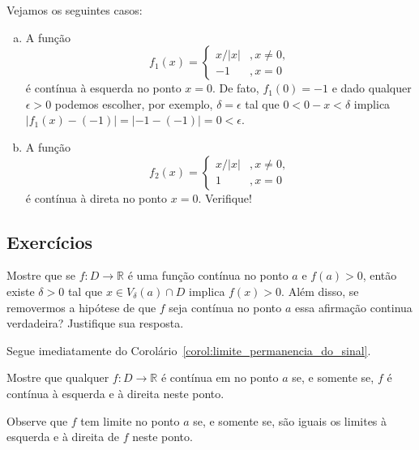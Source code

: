 \begin{ex}
  Vejamos os seguintes casos:
  \begin{enumerate}[a)]
    \item A função
      \begin{equation}
        f_1(x) = \left\{
          \begin{array}{ll}
            x/|x| &, x\neq 0,\\
            -1 &, x=0
          \end{array}
\right.
      \end{equation}
é contínua à esquerda no ponto $x=0$. De fato, $f_1(0)=-1$ e dado qualquer $\epsilon>0$ podemos escolher, por exemplo, $\delta = \epsilon$ tal que $0<0-x<\delta$ implica $|f_1(x)-(-1)|=|-1-(-1)|=0<\epsilon$.
    \item A função
      \begin{equation}
        f_2(x) = \left\{
          \begin{array}{ll}
            x/|x| &, x\neq 0,\\
            1 &, x=0
          \end{array}
\right.
      \end{equation}
é contínua à direta no ponto $x=0$. Verifique!
  \end{enumerate}
\end{ex}

\subsection*{Exercícios}

\begin{exer}
  Mostre que se $f:D\to\mathbb{R}$ é uma função contínua no ponto $a$ e $f(a)>0$, então existe $\delta>0$ tal que $x\in V_\delta(a)\cap D$ implica $f(x)>0$. Além disso, se removermos a hipótese de que $f$ seja contínua no ponto $a$ essa afirmação continua verdadeira? Justifique sua resposta.
\end{exer}
\begin{resp}
  Segue imediatamente do Corolário~\ref{corol:limite_permanencia_do_sinal}.
\end{resp}

\begin{exer}
  Mostre que qualquer $f:D\to\mathbb{R}$ é contínua em no ponto $a$ se, e somente se, $f$ é contínua à esquerda e à direita neste ponto.
\end{exer}
\begin{resp}
  Observe que $f$ tem limite no ponto $a$ se, e somente se, são iguais os limites à esquerda e à direita de $f$ neste ponto.
\end{resp}

